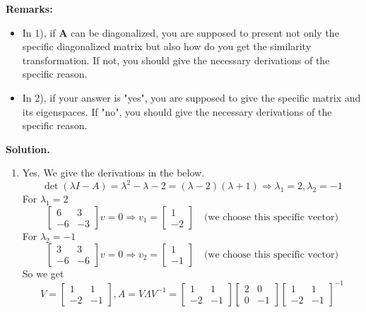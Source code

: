 \documentclass[english,onecolumn]{IEEEtran}
\begin{document}
{\bf Remarks:} 
\begin{itemize}
    \item In 1), if {\bf A} can be diagonalized, you are supposed to present not only the specific diagonalized matrix but also how do you get the similarity transformation.
    If not, you should give the necessary derivations of the specific reason.
    \item In 2), if your answer is "yes", you are supposed to give the specific matrix and its eigenspaces.
    If "no", you should give the necessary derivations of the specific reason.
\end{itemize}

\noindent
\textbf{Solution.}
\begin{enumerate}
    \item Yes. We give the derivations in the below.
    $$ \det (\lambda I - A) = \lambda ^2 - \lambda -2 = (\lambda-2)(\lambda +1) \Rightarrow \lambda_1 = 2, \lambda_2 = -1$$
    For $\lambda_1=2$
    $$\begin{bmatrix}
    	6  & 3\\
    	-6 & -3
    \end{bmatrix}v = 0 \Rightarrow v_1 = \begin{bmatrix}
    	1\\ -2
    \end{bmatrix}\quad \text{(we choose this specific vector)}$$
    For $\lambda_2 = -1 $
     $$\begin{bmatrix}
    	3 & 3\\
    	-6 & -6
    \end{bmatrix}v = 0 \Rightarrow v_2 = \begin{bmatrix}
    	1\\ -1
    \end{bmatrix} \quad \text{(we choose this specific vector)}$$
    So we get 
    $$V = \begin{bmatrix}
    	1 & 1\\
    	-2 & -1
    \end{bmatrix}, A = V\Lambda V^{-1} = \begin{bmatrix}
    	1 & 1\\
    	-2 & -1
    \end{bmatrix}\begin{bmatrix}
    	2 & 0\\
    	0 &-1
    \end{bmatrix}\begin{bmatrix}
    	1 & 1\\
    	-2 & -1
    \end{bmatrix}^{-1}$$

\end{enumerate}
\end{document}

